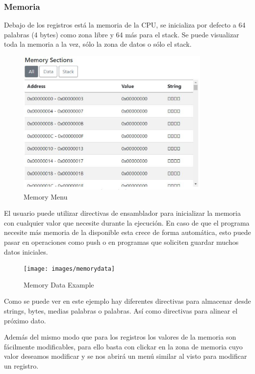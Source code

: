 {        \newpage
        \subsubsection{Memoria}
        {
            Debajo de los registros está la memoria de la CPU, se inicializa por defecto a 64 palabras (4 bytes)
            como zona libre y 64 más para el stack. Se puede visualizar toda la memoria a la vez, sólo la zona de datos o sólo el stack.

            \begin{figure}[h]
                \centering
                \includegraphics[width=0.85\textwidth]{images/memory}
                \caption{Memory Menu}
            \end{figure}

            El usuario puede utilizar directivas de ensamblador para inicializar la memoria
            con cualquier valor que necesite durante la ejecución. En caso de que el programa necesite más memoria de la disponible esta crece de forma automática, esto puede pasar
            en operaciones como push o en programas que soliciten guardar muchos datos iniciales.

            \begin{figure}[h]
                \centering
                \texttt{[image: images/memorydata]}
                \caption{Memory Data Example}
            \end{figure}
            Como se puede ver en este ejemplo hay diferentes directivas para almacenar desde strings, bytes, medias palabras
            o palabras. Así como directivas para alinear el próximo dato.

            Además del mismo modo que para los registros los valores de la memoria son fácilmente modificables,
            para ello basta con clickar en la zona de memoria cuyo valor deseamos modificar y se nos abrirá un menú similar al visto
            para modificar un registro.

}}
